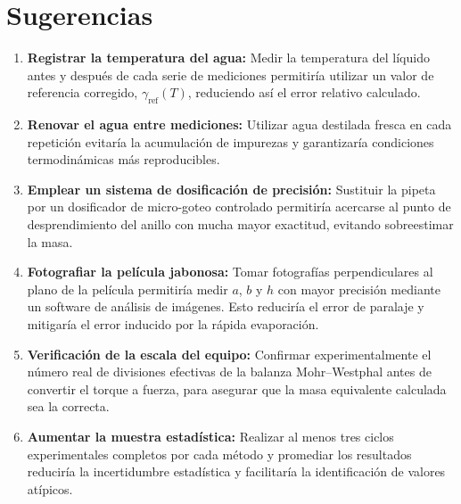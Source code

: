 
\section{Sugerencias}
\label{sec:sugerencias}

\begin{enumerate}

    \item \textbf{Registrar la temperatura del agua:} Medir la
    temperatura del líquido antes y después de cada serie de mediciones
    permitiría utilizar un valor de referencia corregido,
    $\gamma_{\text{ref}}(T)$, reduciendo así el error relativo calculado.

    \item \textbf{Renovar el agua entre mediciones:} Utilizar agua destilada
    fresca en cada repetición evitaría la acumulación de impurezas y
    garantizaría condiciones termodinámicas más reproducibles.

    \item \textbf{Emplear un sistema de dosificación de precisión:}
    Sustituir la pipeta por un dosificador de micro-goteo controlado
    permitiría acercarse al punto de desprendimiento del anillo con
    mucha mayor exactitud, evitando sobreestimar la masa.

    \item \textbf{Fotografiar la película jabonosa:} Tomar fotografías
    perpendiculares al plano de la película permitiría medir $a$, $b$ y $h$ 
    con mayor precisión mediante un software de análisis de imágenes. 
    Esto reduciría el error de paralaje y mitigaría el error inducido por la rápida evaporación.

    \item \textbf{Verificación de la escala del equipo:} Confirmar 
    experimentalmente el número real de divisiones efectivas de la balanza 
    Mohr--Westphal antes de convertir el torque a fuerza, para asegurar 
    que la masa equivalente calculada sea la correcta.

    \item \textbf{Aumentar la muestra estadística:} Realizar al menos tres
    ciclos experimentales completos por cada método y promediar los resultados
    reduciría la incertidumbre estadística y facilitaría la identificación de
    valores atípicos.

\end{enumerate}

